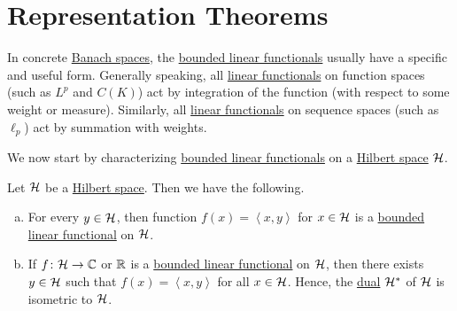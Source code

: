 \section{Representation Theorems}
In concrete \hyperref[def:Banach-space]{Banach spaces}, the \hyperref[def:bounded-linear-functional]{bounded linear functionals} usually have a specific and useful form. Generally speaking, all \hyperref[def:linear-functional]{linear functionals} on function spaces (such as \(L^p\) and \(C(K)\)) act by integration of the function (with respect to some weight or measure). Similarly, all \hyperref[def:linear-functional]{linear functionals} on sequence spaces (such as \(\ell _p\)) act by summation with weights.

We now start by characterizing \hyperref[def:bounded-linear-functional]{bounded linear functionals} on a \hyperref[def:Hilbert-space]{Hilbert space} \(\mathcal{\MakeUppercase{h}} \).
\begin{theorem}\label{thm:Riesz-representation}
	Let \(\mathcal{\MakeUppercase{h}} \) be a \hyperref[def:Hilbert-space]{Hilbert space}. Then we have the following.
	\begin{enumerate}[(a)]
		\item For every \(y\in \mathcal{\MakeUppercase{h}} \), then function \(f(x) = \left\langle x, y \right\rangle \) for \(x\in \mathcal{\MakeUppercase{h}} \) is a \hyperref[def:bounded-linear-functional]{bounded linear functional} on \(\mathcal{\MakeUppercase{h}} \).
		\item If \(f\colon \mathcal{\MakeUppercase{h}} \to \mathbb{\MakeUppercase{c}} \) or \(\mathbb{\MakeUppercase{r}} \) is a \hyperref[def:bounded-linear-functional]{bounded linear functional} on \(\mathcal{\MakeUppercase{h}} \), then there exists \(y\in \mathcal{\MakeUppercase{h}} \) such that \(f(x) = \left\langle x,y \right\rangle \) for all \(x\in \mathcal{\MakeUppercase{h}} \). Hence, the \hyperref[def:dual-space]{dual} \(\mathcal{\MakeUppercase{h}} ^{\ast} \) of \(\mathcal{\MakeUppercase{h}} \) is isometric to \(\mathcal{\MakeUppercase{h}} \).
	\end{enumerate}
\end{theorem}
